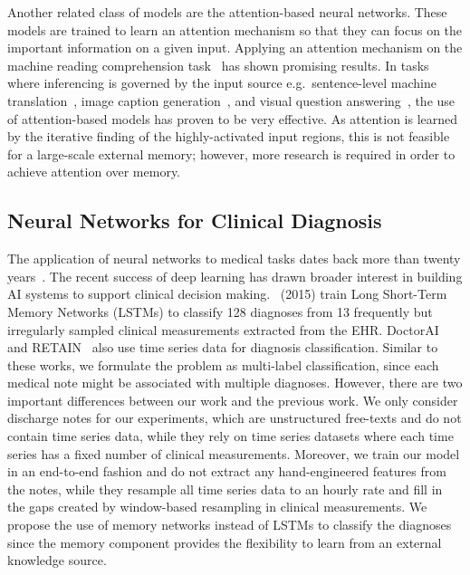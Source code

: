     Another related class of models are the attention-based neural networks. These models are trained to learn an attention mechanism so that they can focus on the important information on a given input. Applying an attention mechanism on the machine reading comprehension task~\cite{Hermann2015TeachingMT,Dhingra2016GatedAttentionRF,Cui2016AttentionoverAttentionNN,Sordoni2016IterativeAN} has shown promising results. In tasks where inferencing is governed by the input source e.g.\ sentence-level machine translation~\cite{bahdanau2014neural}, image caption generation~\cite{xu2015show}, and visual question answering~\cite{lu2016hierarchical}, the use of attention-based models has proven to be very effective. As attention is learned by the iterative finding of the highly-activated input regions, this is not feasible for a large-scale external memory; however, more research is required in order to achieve attention over memory. 
    
    

    \subsection{Neural Networks for Clinical Diagnosis}
    The application of neural networks to medical tasks dates back more than twenty years~\cite{baxt1990use}. The recent success of deep learning has drawn broader interest in building AI systems to support clinical decision making.~\citeauthor{DBLP:journals/corr/LiptonKEW15} (2015) train Long Short-Term Memory Networks (LSTMs) to classify 128 diagnoses from 13 frequently but irregularly sampled clinical measurements extracted from the EHR\@. DoctorAI~\cite{choi2015doctor} and RETAIN~\cite{Choi2016RETAINIP} also use time series data for diagnosis classification. Similar to these works, we formulate the problem as multi-label classification, since each medical note might be associated with multiple diagnoses. However, there are two important differences between our work and the previous work. We only consider discharge notes for our experiments, which are unstructured free-texts and do not contain time series data, while they rely on time series datasets where each time series has a fixed number of clinical measurements. Moreover, we train our model in an end-to-end fashion and do not extract any hand-engineered features from the notes, while they resample all time series data to an hourly rate and fill in the gaps created by window-based resampling in clinical measurements. We propose the use of memory networks instead of LSTMs to classify the  diagnoses since the memory component provides the flexibility to learn from an external knowledge source. 

